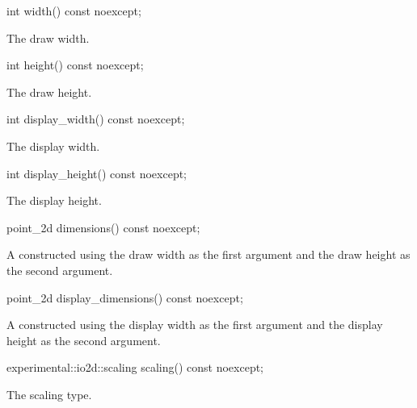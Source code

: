 %
\begin{itemdecl}
int width() const noexcept;
\end{itemdecl}
\begin{itemdescr}
\pnum
\returns
The draw width.
\end{itemdescr}

%
\begin{itemdecl}
int height() const noexcept;
\end{itemdecl}
\begin{itemdescr}
\pnum
\returns
The draw height.
\end{itemdescr}

%
\begin{itemdecl}
int display_width() const noexcept;
\end{itemdecl}
\begin{itemdescr}
\pnum
\returns
The display width.
\end{itemdescr}

%
\begin{itemdecl}
int display_height() const noexcept;
\end{itemdecl}
\begin{itemdescr}
\pnum
\returns
The display height.
\end{itemdescr}

%
\begin{itemdecl}
point_2d dimensions() const noexcept;
\end{itemdecl}
\begin{itemdescr}
\pnum
\returns
A  constructed using the draw width as the first argument and the draw height as the second argument.
\end{itemdescr}

%
\begin{itemdecl}
point_2d display_dimensions() const noexcept;
\end{itemdecl}
\begin{itemdescr}
\pnum
\returns
A  constructed using the display width as the first argument and the display height as the second argument.
\end{itemdescr}

%
\begin{itemdecl}
experimental::io2d::scaling scaling() const noexcept;
\end{itemdecl}
\begin{itemdescr}
\pnum
\returns
The scaling type.
\end{itemdescr}

